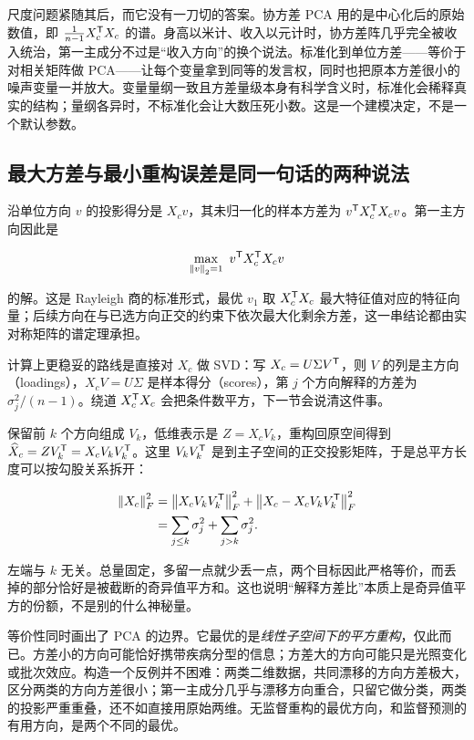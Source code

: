 尺度问题紧随其后，而它没有一刀切的答案。协方差 PCA 用的是中心化后的原始数值，即 \(\frac{1}{n-1}X_c^{\mathsf{T}}X_c\) 的谱。身高以米计、收入以元计时，协方差阵几乎完全被收入统治，第一主成分不过是``收入方向''的换个说法。标准化到单位方差——等价于对相关矩阵做 PCA——让每个变量拿到同等的发言权，同时也把原本方差很小的噪声变量一并放大。变量量纲一致且方差量级本身有科学含义时，标准化会稀释真实的结构；量纲各异时，不标准化会让大数压死小数。这是一个建模决定，不是一个默认参数。

\subsection{最大方差与最小重构误差是同一句话的两种说法}

沿单位方向 \(v\) 的投影得分是 \(X_c v\)，其未归一化的样本方差为 \(v^{\mathsf{T}}X_c^{\mathsf{T}}X_c v\)。第一主方向因此是

\[
\max_{\left\lVert v\right\rVert_2=1}\ v^{\mathsf{T}} X_c^{\mathsf{T}} X_c v
\]

的解。这是 Rayleigh 商的标准形式，最优 \(v_1\) 取 \(X_c^{\mathsf{T}}X_c\) 最大特征值对应的特征向量；后续方向在与已选方向正交的约束下依次最大化剩余方差，这一串结论都由实对称矩阵的谱定理承担。

计算上更稳妥的路线是直接对 \(X_c\) 做 SVD：写 \(X_c = U\Sigma V^{\mathsf{T}}\)，则 \(V\) 的列是主方向（loadings），\(X_cV = U\Sigma\) 是样本得分（scores），第 \(j\) 个方向解释的方差为 \(\sigma_j^2/(n-1)\)。绕道 \(X_c^{\mathsf{T}}X_c\) 会把条件数平方，下一节会说清这件事。

保留前 \(k\) 个方向组成 \(V_k\)，低维表示是 \(Z = X_cV_k\)，重构回原空间得到 \(\widehat X_c = ZV_k^{\mathsf{T}} = X_cV_kV_k^{\mathsf{T}}\)。这里 \(V_kV_k^{\mathsf{T}}\) 是到主子空间的正交投影矩阵，于是总平方长度可以按勾股关系拆开：

\[
\begin{aligned}
\left\lVert X_c\right\rVert_F^2
&= \left\lVert X_cV_kV_k^{\mathsf{T}}\right\rVert_F^2 + \left\lVert X_c - X_cV_kV_k^{\mathsf{T}}\right\rVert_F^2\\
&= \sum_{j\le k}\sigma_j^2 + \sum_{j>k}\sigma_j^2 .
\end{aligned}
\]

左端与 \(k\) 无关。总量固定，多留一点就少丢一点，两个目标因此严格等价，而丢掉的部分恰好是被截断的奇异值平方和。这也说明``解释方差比''本质上是奇异值平方的份额，不是别的什么神秘量。

等价性同时画出了 PCA 的边界。它最优的是\emph{线性子空间下的平方重构}，仅此而已。方差小的方向可能恰好携带疾病分型的信息；方差大的方向可能只是光照变化或批次效应。构造一个反例并不困难：两类二维数据，共同漂移的方向方差极大，区分两类的方向方差很小；第一主成分几乎与漂移方向重合，只留它做分类，两类的投影严重重叠，还不如直接用原始两维。无监督重构的最优方向，和监督预测的有用方向，是两个不同的最优。

